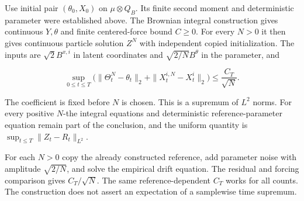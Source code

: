 \documentclass[11pt,a4paper]{report}
\begin{document}
Use initial pair \((\theta_0,X_0)\) on \(\mu\otimes Q_B\). Its finite second moment and deterministic parameter were established above. The Brownian integral construction gives continuous \(Y,\theta\) and finite centered-force bound \(C\ge0\). For every \(N>0\) it then gives continuous particle solution \(Z^N\) with independent copied initialization. The inputs are \(\sqrt2 B^{x,i}\) in latent coordinates and \(\sqrt{2/N}B^\theta\) in the parameter, and

\[\sup_{0\le t\le T}\big(\|\Theta_t^N-\theta_t\|_2+\|X_t^{i,N}-X_t^i\|_2\big)\le\frac{C_T}{\sqrt N}.\]

The coefficient is fixed before \(N\) is chosen. This is a supremum of \(L^2\) norms. For every positive \(N\)-the integral equations and deterministic reference-parameter equation remain part of the conclusion, and the uniform quantity is \(\sup_{t\le T}\|Z_t-R_t\|_{L^2}\).



For each \(N>0\) copy the already constructed reference, add parameter noise with amplitude \(\sqrt{2/N}\), and solve the empirical drift equation. The residual and forcing comparison gives \(C_T/\sqrt N\). The same reference-dependent \(C_T\) works for all counts. The construction does not assert an expectation of a samplewise time supremum.
\end{document}
